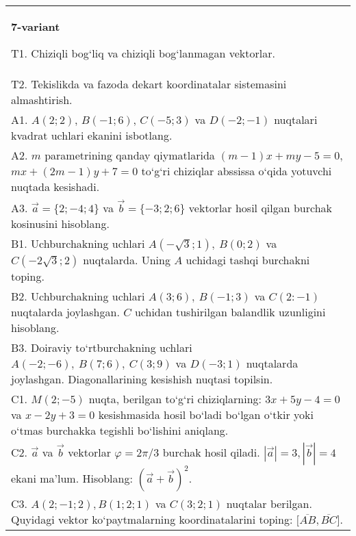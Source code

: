 \documentclass{article}
\begin{document}
\begin{tabular}{m{17cm}}
\textbf{7-variant}

T1. 
Chiziqli bog‘liq va chiziqli bog‘lanmagan vektorlar.
 \\
T2. 
Tekislikda va fazoda dekart koordinatalar sistemasini almashtirish.
 \\
A1. 
$A (2;2) $, $B (-1;6) $, $C (-5;3) $ va $D (-2;-1) $
nuqtalari kvadrat uchlari ekanini isbotlang.
 \\
A2. 
$m$ parametrining qanday qiymatlarida
$ (m-1) x+my-5=0$, $mx+ (2m-1) y+7=0$ to‘g‘ri chiziqlar abssissa
o‘qida yotuvchi nuqtada kesishadi.
 \\
A3. 
$\overrightarrow{a} = \{ 2; - 4;4\}$ va $\overrightarrow{b} = \{ - 3;2;6\}$
vektorlar hosil qilgan burchak kosinusini hisoblang.
 \\
B1. 
Uchburchakning uchlari
\(A\left(-\sqrt{3};1 \right),\ B (0;2) \) va
\(C\left(-2\sqrt{3};2 \right) \) nuqtalarda. Uning $A$
uchidagi tashqi burchakni toping.
 \\
B2. 
Uchburchakning uchlari \(A (3;6),\ B (-1;3) \) va
\(C (2:-1) \) nuqtalarda joylashgan. $C$ uchidan tushirilgan balandlik uzunligini hisoblang.
 \\
B3. 
Doiraviy to‘rtburchakning uchlari
\(A (-2;-6),\ B (7;6),\ C (3;9) \) va \(D (-3;1) \) nuqtalarda
joylashgan. Diagonallarining kesishish nuqtasi topilsin.
 \\
C1. 
\(M (2;-5) \) nuqta, berilgan to‘g‘ri chiziqlarning:
\(3x+5y-4=0\) va \(x-2y+3=0\) kesishmasida hosil bo‘ladi
bo‘lgan o‘tkir yoki o‘tmas burchakka tegishli bo‘lishini aniqlang.
 \\
C2. 
$\vec{a}$ va $\vec{b}$ vektorlar $\varphi = 2\pi/3$ burchak hosil qiladi. $|\vec{a}| = 3,|\vec{b}| = 4$ ekani ma’lum. Hisoblang:
$ (\vec{a} + \vec{b}) ^{2}$.
 \\
C3. 
$A (2; -1;2),B (1;2; 1) $ va $C (3;2;1)$ nuqtalar berilgan. Quyidagi vektor ko‘paytmalarning koordinatalarini toping:
$\lbrack\overline{AB},\overline{BC}\rbrack$.
 \\

\end{tabular}
\vspace{1cm}
\end{document}
